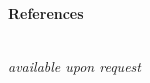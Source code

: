 \documentclass[letterpaper,11pt]{article}
\begin{document}



\begin{Large}\textbf{\\References}\end{Large}

\textit{\\available upon request}
%
%
%


\end{document}
